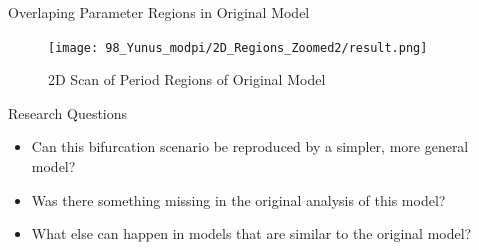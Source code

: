 

\begin{frame}{Overlaping Parameter Regions in Original Model}
    \begin{figure}
        \centering
        \texttt{[image: 98\_Yunus\_modpi/2D\_Regions\_Zoomed2/result.png]}
        \caption{2D Scan of Period Regions of Original Model}
    \end{figure}
\end{frame}

\begin{frame}{Research Questions}
    \begin{itemize}
        \item Can this bifurcation scenario be reproduced by a simpler, more general model?
        \item Was there something missing in the original analysis of this model?
        \item What else can happen in models that are similar to the original model?
    \end{itemize}
\end{frame}
